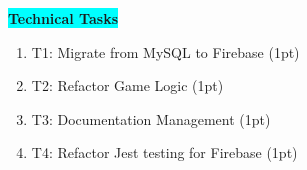 \colorbox{cyan}{\textbf{Technical Tasks}}

\begin{enumerate}
    \item {T1: Migrate from MySQL to Firebase (1pt)}
    \item {T2: Refactor Game Logic (1pt)}
    \item {T3: Documentation Management (1pt)}
    \item {T4: Refactor Jest testing for Firebase (1pt)}
\end{enumerate}



